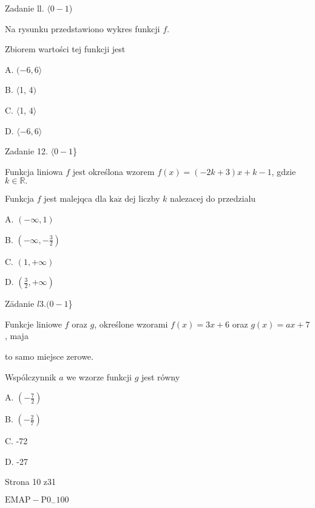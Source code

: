 \documentclass[a4paper,12pt]{article}
\begin{document}
Zadanie ll. $\langle 0-1$)

Na rysunku przedstawiono wykres funkcji $f.$

Zbiorem wartości tej funkcji jest

A. $(-6,6\rangle$

B. $\langle$1, 4$)$

C. $\langle$1, $ 4\rangle$

D. $\langle-6,  6\rangle$

Zadanie 12. $\langle 0-1$\}

Funkcja liniowa $f$ jest określona wzorem $f(x)=(-2k+3)x+k-1$, gdzie $k\in \mathbb{R}.$

Funkcja $f$ jest malejqca dla $\mathrm{k}\mathrm{a}\dot{\mathrm{z}}$ dej liczby $k$ nalezacej do przedzialu

A. $(-\infty,1)$

B. $(-\displaystyle \infty,-\frac{3}{2})$

C. $(1,+\infty)$

D. $(\displaystyle \frac{3}{2},+\infty)$

Zädanie $l3. (0-1$\}

Funkcje liniowe $f$ oraz $g$, określone wzorami $f(x)=3x+6$ oraz $g(x)=ax+7$, maja

to samo miejsce zerowe.

Wspólczynnik $a$ we wzorze funkcji $g$ jest równy

A. $(-\displaystyle \frac{7}{2})$

B. $(-\displaystyle \frac{2}{7})$

C. -72

D. -27

Strona 10 z31

$\mathrm{E}\mathrm{M}\mathrm{A}\mathrm{P}-\mathrm{P}0_{-}100$
\end{document}
